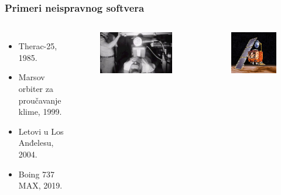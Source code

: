 \documentclass{beamer}
\begin{document}
\begin{frame}
\frametitle{Primeri neispravnog softvera}

\begin{columns}[c] %

\begin{itemize}
\item Therac-25, 1985.
\item Marsov orbiter za proučavanje klime, 1999.
\item Letovi u Los Anđelesu, 2004.
\item Boing 737 MAX, 2019.
\end{itemize}


\begin{figure}
\includegraphics[width=1\linewidth]{therac.jpg}
\end{figure}

\begin{figure}
\includegraphics[width=1\linewidth]{MCO.jpg}
\end{figure}

\end{columns}
\end{frame}
\end{document}
